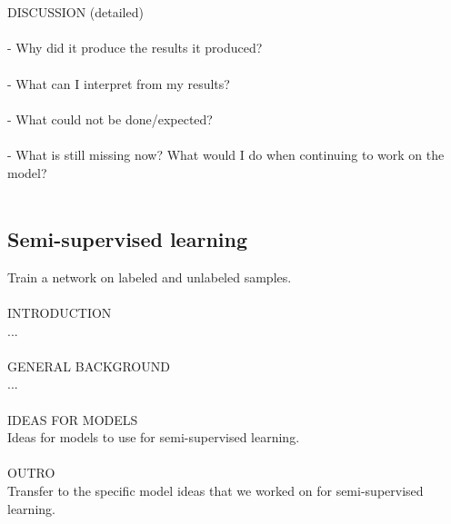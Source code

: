 \\
\\
DISCUSSION (detailed) \\
\\
- Why did it produce the results it produced? \\
\\
- What can I interpret from my results? \\
\\
- What could not be done/expected? \\
\\
- What is still missing now? What would I do when continuing to work on the model? \\
\\


\subsection{Semi-supervised learning}

Train a network on labeled and unlabeled samples. \\
\\
INTRODUCTION \\
... \\
\\
GENERAL BACKGROUND \\
... \\
\\
IDEAS FOR MODELS \\
Ideas for models to use for semi-supervised learning. \\
\\
OUTRO \\
Transfer to the specific model ideas that we worked on for semi-supervised learning. \\
\\

